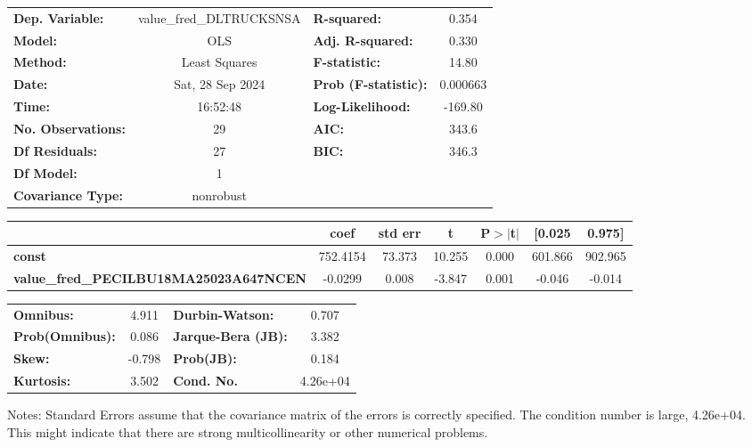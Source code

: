 \begin{center}
\begin{tabular}{lclc}
\toprule
\textbf{Dep. Variable:}                        & value\_fred\_DLTRUCKSNSA & \textbf{  R-squared:         } &     0.354   \\
\textbf{Model:}                                &           OLS            & \textbf{  Adj. R-squared:    } &     0.330   \\
\textbf{Method:}                               &      Least Squares       & \textbf{  F-statistic:       } &     14.80   \\
\textbf{Date:}                                 &     Sat, 28 Sep 2024     & \textbf{  Prob (F-statistic):} &  0.000663   \\
\textbf{Time:}                                 &         16:52:48         & \textbf{  Log-Likelihood:    } &   -169.80   \\
\textbf{No. Observations:}                     &              29          & \textbf{  AIC:               } &     343.6   \\
\textbf{Df Residuals:}                         &              27          & \textbf{  BIC:               } &     346.3   \\
\textbf{Df Model:}                             &               1          & \textbf{                     } &             \\
\textbf{Covariance Type:}                      &        nonrobust         & \textbf{                     } &             \\
\bottomrule
\end{tabular}
\begin{tabular}{lcccccc}
                                               & \textbf{coef} & \textbf{std err} & \textbf{t} & \textbf{P$> |$t$|$} & \textbf{[0.025} & \textbf{0.975]}  \\
\midrule
\textbf{const}                                 &     752.4154  &       73.373     &    10.255  &         0.000        &      601.866    &      902.965     \\
\textbf{value\_fred\_PECILBU18MA25023A647NCEN} &      -0.0299  &        0.008     &    -3.847  &         0.001        &       -0.046    &       -0.014     \\
\bottomrule
\end{tabular}
\begin{tabular}{lclc}
\textbf{Omnibus:}       &  4.911 & \textbf{  Durbin-Watson:     } &    0.707  \\
\textbf{Prob(Omnibus):} &  0.086 & \textbf{  Jarque-Bera (JB):  } &    3.382  \\
\textbf{Skew:}          & -0.798 & \textbf{  Prob(JB):          } &    0.184  \\
\textbf{Kurtosis:}      &  3.502 & \textbf{  Cond. No.          } & 4.26e+04  \\
\bottomrule
\end{tabular}
\end{center}

Notes: \newline
 [1] Standard Errors assume that the covariance matrix of the errors is correctly specified. \newline
 [2] The condition number is large, 4.26e+04. This might indicate that there are \newline
 strong multicollinearity or other numerical problems.